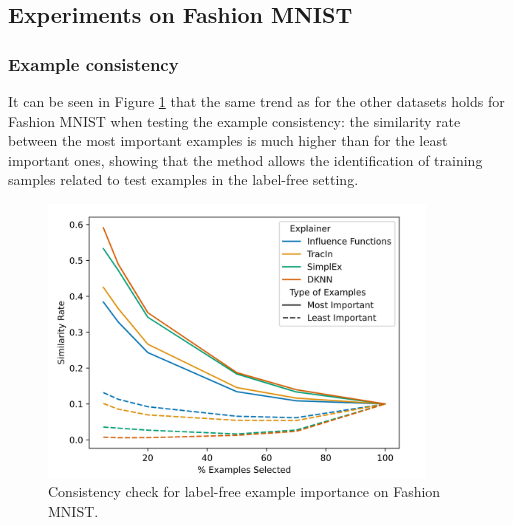 \subsection{Experiments on Fashion MNIST}
\label{appendix:pretext_visualisations_fmnist}

\subsubsection{Example consistency}
It can be seen in Figure \ref{fig:fashion_example} that the same trend as for the other datasets holds for Fashion MNIST when testing the example consistency: the similarity rate between the most important examples is much higher than for the least important ones, showing that the method allows the identification of training samples related to test examples in the label-free setting.
\begin{figure}[H]
    \centering
    \includegraphics[width=10cm]{images/example_consistency_fmnist.png}
    \caption{ Consistency check for label-free example importance on Fashion MNIST. }
    \label{fig:fashion_example}
\end{figure}


